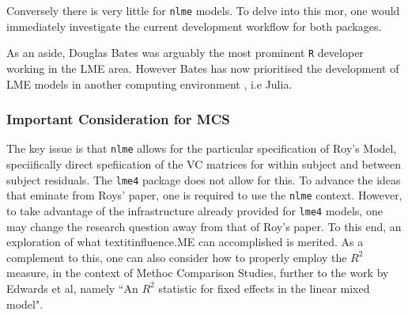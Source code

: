 \documentclass[12pt, a4paper]{report}
\theoremstyle{plain}
\theoremstyle{definition}
\theoremstyle{remark}
\begin{document}
Conversely there is very little for \texttt{nlme} models. To delve into this mor, one would immediately investigate the current development workflow for both packages.

As an aside, Douglas Bates was arguably the most prominent \texttt{R} developer working in the LME area. 
However Bates has now prioritised the development of LME models in another computing environment , i.e Julia. 


\subsubsection*{Important Consideration for MCS}

The key issue is that \texttt{nlme} allows for the particular specification of Roy's Model, speciifically direct spefiication of the VC matrices for within subject and between subject residuals.
The \texttt{lme4} package does not allow for this.
To advance the ideas that eminate from Roys' paper, one is required to use the \texttt{nlme} context. However, to take advantage of the infrastructure already provided for \texttt{lme4} models, one may change the research question away from that of Roy's paper. 
To this end, an exploration of what textit{influence.ME} can accomplished is merited.
As a complement to this, one can also consider how to properly employ the $R^2$ measure, in the context of Methoc Comparison Studies, further to the work by Edwards et al, namely ``An $R^2$ statistic for fixed effects in the linear mixed model".
\end{document}

